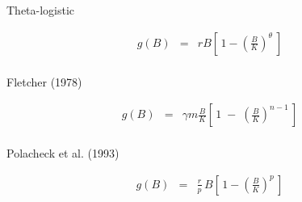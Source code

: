 \documentclass[11pt]{article}
\begin{document}
Theta-logistic

\begin{eqnarray*}
  g(B) &=& rB\!\left[\,1\!-\!\left(\frac{B}{K}\right)^{\!\theta}\:\right]\\[1ex]
\end{eqnarray*}

Fletcher (1978)

\begin{eqnarray*}
  g(B) &=& \gamma m\frac{B}{K}\left[\,1 \;-\;
    \left(\frac{B}{K}\right)^{\!\!n-1}\,\right]\\[1ex]
\end{eqnarray*}


Polacheck et al. (1993)

\begin{eqnarray*}
  g(B) &=& \frac{r}{p}\,B\!
  \left[\,1\!-\!\left(\frac{B}{K}\right)^{\!p}\,\right]\\[1ex]
\end{eqnarray*}
\end{document}
